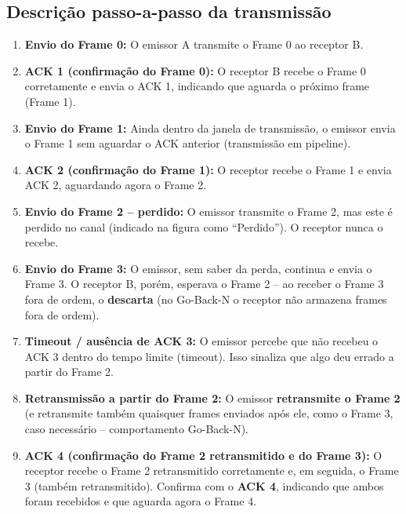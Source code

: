 \documentclass[12pt,a4paper]{article}
\begin{document}
\subsection*{Descrição passo-a-passo da transmissão}

\begin{enumerate}[label=\textbf{Passo \arabic*.}, leftmargin=*, itemsep=4pt]
    \item \textbf{Envio do Frame 0:} O emissor A transmite o Frame 0 ao receptor B.

    \item \textbf{ACK 1 (confirmação do Frame 0):} O receptor B recebe o Frame 0 corretamente e envia o ACK 1, indicando que aguarda o próximo frame (Frame 1).

    \item \textbf{Envio do Frame 1:} Ainda dentro da janela de transmissão, o emissor envia o Frame 1 sem aguardar o ACK anterior (transmissão em pipeline).

    \item \textbf{ACK 2 (confirmação do Frame 1):} O receptor recebe o Frame 1 e envia ACK 2, aguardando agora o Frame 2.

    \item \textbf{Envio do Frame 2 -- perdido:} O emissor transmite o Frame 2, mas este é perdido no canal (indicado na figura como ``Perdido''). O receptor nunca o recebe.

    \item \textbf{Envio do Frame 3:} O emissor, sem saber da perda, continua e envia o Frame 3. O receptor B, porém, esperava o Frame 2 -- ao receber o Frame 3 fora de ordem, o \textbf{descarta} (no Go-Back-N o receptor não armazena frames fora de ordem).

    \item \textbf{Timeout / ausência de ACK 3:} O emissor percebe que não recebeu o ACK 3 dentro do tempo limite (timeout). Isso sinaliza que algo deu errado a partir do Frame 2.

    \item \textbf{Retransmissão a partir do Frame 2:} O emissor \textbf{retransmite o Frame 2} (e retransmite também quaisquer frames enviados após ele, como o Frame 3, caso necessário -- comportamento Go-Back-N).

    \item \textbf{ACK 4 (confirmação do Frame 2 retransmitido e do Frame 3):} O receptor recebe o Frame 2 retransmitido corretamente e, em seguida, o Frame 3 (também retransmitido). Confirma com o \textbf{ACK 4}, indicando que ambos foram recebidos e que aguarda agora o Frame 4.
\end{enumerate}
\end{document}
